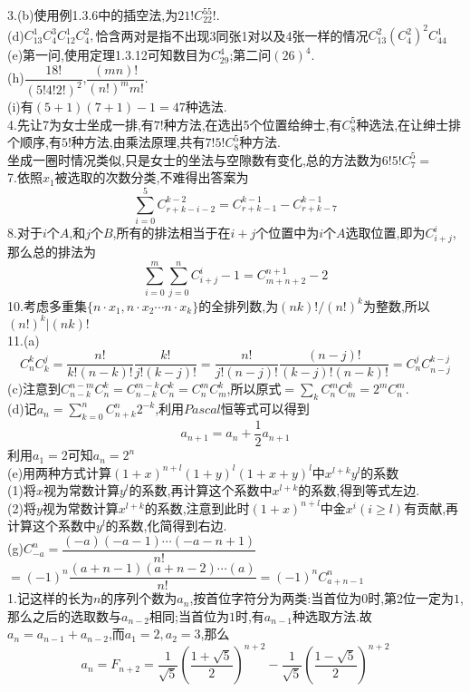\documentclass[b5paper]{ctexart}
\begin{document}
\pagestyle{plain}
\noindent
{}
3.(b)使用例1.3.6中的插空法,为$21!C_{22}^55!.$\\
(d)$C_{13}^1C_4^3C_{12}^1C_4^2,$恰含两对是指不出现3同张1对以及4张一样的情况$C_{13}^2(C_4^2)^2C_{44}^1$\\
(e)第一问,使用定理1.3.12可知数目为$C_{29}^4$;第二问$(26)^4.$\\
(h)$\dfrac{18!}{(5!4!2!)^2}$,$\dfrac{(mn)!}{(n!)^mm!}$.\\
(i)有$(5+1)(7+1)-1=47$种选法.\\
4.先让7为女士坐成一排,有$7!$种方法,在选出5个位置给绅士,有$C_8^5$种选法,在让绅士排个顺序,有$5!$种方法,由乘法原理,共有$7!5!C_8^5$种方法.\\
坐成一圈时情况类似,只是女士的坐法与空隙数有变化,总的方法数为$6!5!C_7^5=$\\
7.依照$x_1$被选取的次数分类,不难得出答案为
\[\sum_{i=0}^5C_{r+k-i-2}^{k-2}=C_{r+k-1}^{k-1}-C_{r+k-7}^{k-1}\]
8.对于$i$个$A$,和$j$个$B$,所有的排法相当于在$i+j$个位置中为$i$个$A$选取位置,即为$C_{i+j}^i$,那么总的排法为
\[\sum_{i=0}^m\sum_{j=0}^nC_{i+j}^i-1=C_{m+n+2}^{n+1}-2\]
10.考虑多重集$\{n\cdot x_1,n\cdot x_2\cdots n\cdot x_k\}$的全排列数,为$(nk)!/(n!)^k$为整数,所以$(n!)^k|(nk)!$\\
11.(a)
\[C_n^kC_k^j=\dfrac{n!}{k!(n-k)!}\dfrac{k!}{j!(k-j)!}=\dfrac{n!}{j!(n-j)!}\dfrac{(n-j)!}{(k-j)!(n-k)!}=C_n^jC_{n-j}^{k-j}\]
(c)注意到$C_{n-k}^{n-m}C_n^k=C_{n-k}^{m-k}C_n^k=C_n^mC_m^k$,所以原式$=\sum\limits_kC_n^mC_m^k=2^mC_n^m.$\\
(d)记$a_n=\sum\limits_{k=0}^nC_{n+k}^n2^{-k}$,利用$Pascal$恒等式可以得到
\[a_{n+1}=a_n+\dfrac{1}{2}a_{n+1}\]
利用$a_1=2$可知$a_n=2^n$\\
(e)用两种方式计算$(1+x)^{n+l}(1+y)^l(1+x+y)^l$中$x^{l+k}y^l$的系数\\
(1)将$x$视为常数计算$y^l$的系数,再计算这个系数中$x^{l+k}$的系数,得到等式左边.\\
(2)将$y$视为常数计算$x^{l+k}$的系数,注意到此时$(1+x)^{n+l}$中金$x^i(i\geq l)$有贡献,再计算这个系数中$y^l$的系数,化简得到右边.\\
(g)$C_{-a}^n=\dfrac{(-a)(-a-1)\cdots(-a-n+1)}{n!}$\\
$=(-1)^n\dfrac{(a+n-1)(a+n-2)\cdots (a)}{n!}=(-1)^nC_{a+n-1}^n$\\
1.记这样的长为$n$的序列个数为$a_n$,按首位字符分为两类:当首位为$0$时,第2位一定为$1$,那么之后的选取数与$a_{n-2}$相同;当首位为$1$时,有$a_{n-1}$种选取方法.故$a_n=a_{n-1}+a_{n-2}$,而$a_1=2,a_2=3$,那么
\[a_n=F_{n+2}=\dfrac{1}{\sqrt{5}}\left( \dfrac{1+\sqrt{5}}{2}\right)^{n+2}-\dfrac{1}{\sqrt{5}}\left( \dfrac{1-\sqrt{5}}{2}\right)^{n+2} \]
\end{document}
